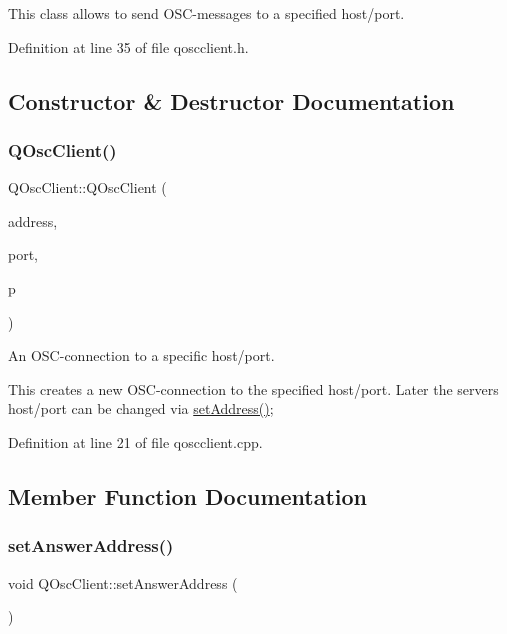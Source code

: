 This class allows to send O\+S\+C-\/messages to a specified host/port. 

Definition at line 35 of file qoscclient.\+h.



\subsection{Constructor \& Destructor Documentation}
\mbox{\label{class_q_osc_client_ab8137cbb3fc5c91cf8a40c7fef6edcae}} 
\subsubsection{\texorpdfstring{Q\+Osc\+Client()}{QOscClient()}}
{\footnotesize\ttfamily Q\+Osc\+Client\+::\+Q\+Osc\+Client (\begin{DoxyParamCaption}\item[{const Q\+Host\+Address \&}]{address,  }\item[{quint16}]{port,  }\item[{Q\+Object $\ast$}]{p }\end{DoxyParamCaption})}



An O\+S\+C-\/connection to a specific host/port. 

This creates a new O\+S\+C-\/connection to the specified host/port. Later the servers host/port can be changed via \hyperlink{class_q_osc_client_aeb14189d328f3d34b02c51e350ec57a8}{set\+Address()}; 

Definition at line 21 of file qoscclient.\+cpp.



\subsection{Member Function Documentation}
\mbox{\label{class_q_osc_client_aa8c58c8ca8821dba32c20d63d8ade376}} 
\subsubsection{\texorpdfstring{set\+Answer\+Address()}{setAnswerAddress()}}
{\footnotesize\ttfamily void Q\+Osc\+Client\+::set\+Answer\+Address (\begin{DoxyParamCaption}\item[{\hyperlink{class_q_osc_server}{Q\+Osc\+Server} $\ast$}]{ }\end{DoxyParamCaption})}



